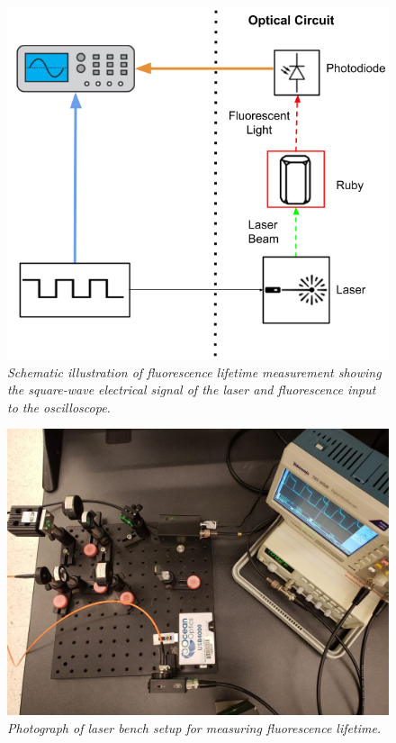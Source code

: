 \documentclass[11pt, a4paper, twocolumn]{article}
\begin{document}
\begin{figure}[]
\includegraphics[width=\linewidth]{decayMeasurementSchematic.png}
\caption{\textit{Schematic illustration of fluorescence lifetime measurement showing the square-wave electrical signal of the laser and fluorescence input to the oscilloscope.}}
\label{fig:decayMeasurementSchematic}
\end{figure}

\begin{figure} [H]
\includegraphics[width=\linewidth, height=\linewidth]{laserBenchPhoto.png}
\caption{\textit{Photograph of laser bench setup for measuring fluorescence lifetime.
}}
\label{fig:laserBenchPhoto}
\end{figure}
\end{document}
